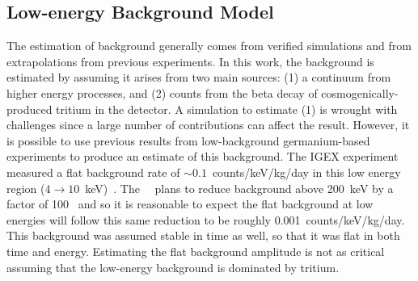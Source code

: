 		\subsection{Low-energy Background Model}
		\label{sec:MJLowEnergyBackgroundModel}
		
The estimation of background generally comes from verified simulations and from extrapolations from previous experiments.  In this work, the background is estimated by assuming it arises from two main sources: (1) a continuum from higher energy processes, and (2) counts from the beta decay of cosmogenically-produced tritium in the detector.  A simulation to estimate (1) is wrought with challenges since a large number of contributions can affect the result.  However, it is possible to use previous results from low-background germanium-based experiments to produce an estimate of this background.  The IGEX experiment measured a flat background rate of $\sim0.1$~counts/keV/kg/day in this low energy region ($4\to10$~keV)~\cite{Ira01}.    The \MJ~\minmod~plans to reduce background above 200~keV by a factor of 100~\cite{Gaitskell:2003zr} and so it is reasonable to expect the flat background at low energies will follow this same reduction to be roughly 0.001~counts/keV/kg/day.  This background was assumed stable in time as well, so that it was flat in both time and energy.  Estimating the flat background amplitude is not as critical assuming that the low-energy background is dominated by tritium.  

